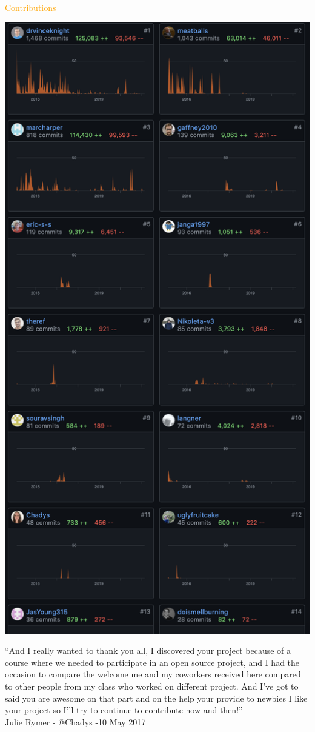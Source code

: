 \documentclass{beamer}
\begin{document}
\begin{frame}
    \centering
    \Huge \textcolor{orange}{Contributions}
\end{frame}

\begin{frame}
    \centering
    \includegraphics[width=.40\textwidth]{static/contributions.png}
\end{frame}

\begin{frame}
    \footnotesize
    ``And I really wanted to thank you all, I discovered your project because of a
    course where we needed to participate in an open source project, and I had
    the occasion to compare the welcome me and my coworkers received here
    compared to other people from my class who worked on different project. And
    I’ve got to said you are awesome on that part and on the help your provide
    to newbies I like your project so I’ll try to continue to contribute now and
    then!'' \\

    Julie Rymer - @Chadys -10 May 2017
\end{frame}
\end{document}
